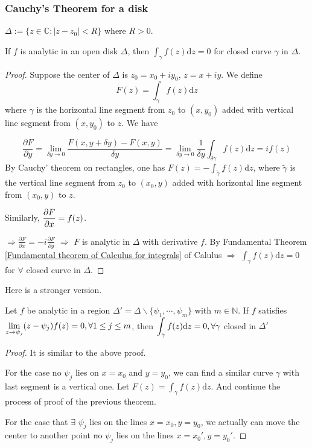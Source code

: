 \subsubsection{Cauchy's Theorem for a disk}
$ \Delta:=\{z\in \mathbb{C}:|z-z_0|<R\} $ where  $ R>0 $.
\begin{theorem}\label{Cauchy's theorem for a disk}
   If  $ f $ is analytic in an open disk  $ \Delta $, then  $ \int_\gamma f(z)\mathrm{d}z=0 $  for closed curve  $ \gamma $ in  $ \Delta $.  
\end{theorem}  
\begin{proof}
   Suppose the center of  $ \Delta $ is  $ z_0=x_0+iy_0 $,  $ z=x+iy $. We define 
   \[F(z)=\int_\gamma f(z)\mathrm{d}z\]
   where  $ \gamma $ is the horizontal line segment from  $ z_0 $ to  $ (x,y_0) $ added with vertical line segment from  $ (x,y_0) $ to  $ z $. We have
    
\begin{equation}
      \frac{\partial F}{\partial y}=\lim_{\delta y\to 0}\frac{F(x,y+\delta y)-F(x,y)}{\delta y}=\lim_{\delta y\to 0}\frac{1}{\delta y}\int_{\delta\gamma}f(z)\mathrm{d}z=if(z)
\end{equation}
   By Cauchy' theorem on rectangles, one has  $ F(z)=-\int_{\tilde{\gamma}}f(z)\mathrm{d}z $, where  $ \tilde{\gamma} $ is the vertical line segment from  $ z_0 $ to  $ (x_0,y) $ added with horizontal line segment from  $ (x_0,y) $ to  $ z $.
   
   Similarly,  $ \displaystyle\frac{\partial F}{\partial x}=f(z) $.
   
   $ \Rightarrow \frac{\partial F}{\partial x}=-i\frac{\partial F}{\partial y} $ $ \Rightarrow  $ $ F  $   is analytic in  $ \Delta $  with derivative  $ f $.
   By Fundamental Theorem \ref{Fundamental theorem of Calculus for integrals} of Calulus $ \Rightarrow  $  $ \int_\gamma f(z)\mathrm{d}z=0 $ for  $ \forall  $ closed curve in  $ \Delta $.    
\end{proof}
Here is a stronger version.
\begin{theorem}\label{stronger version of Cauchy's theorem for a disk}
    Let  $ f $ be analytic in a region  $ \Delta'=\Delta\backslash\{\psi_1,\cdots,\psi_m\} $ with  $ m\in \mathbb{N} $. If  $ f $ satisfies  $ \displaystyle\lim\limits_{z\to \psi_j}(z-\psi_j)f(z)=0,\forall 1\leq j\leq m $, then  $ \displaystyle\int_\gamma f(z)\mathrm{d}z=0,\forall \gamma $ closed in  $ \Delta'  $     
\end{theorem}
\begin{proof}
    It is similar to the above proof.
    
    For the case no  $ \psi_j $ lies on  $ x=x_0 $ and  $ y=y_0 $, we can find a similar curve $ \gamma $ with last segment is a vertical one. Let  $ F(z)=\int_\gamma f(z)\mathrm{d}z $. And continue the process of proof of the previous theorem.  
    
    For the case that  $ \exists $  $ \psi_j $ lies on the lines  $ x=x_0,y=y_0 $, we actually can move the center to another point \st no  $ \psi_j $ lies on the lines  $ x=x_0',y=y_0'$.   
\end{proof}
